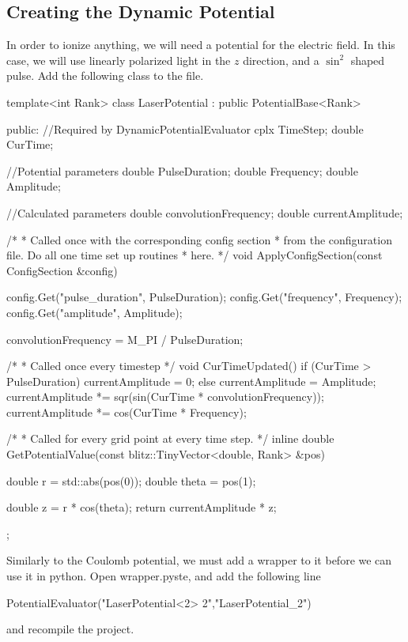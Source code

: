 \subsection{Creating the Dynamic Potential}
In order to ionize anything, we will need a potential for the electric field. In this case, we will use linearly polarized light in the $z$ direction, and a $\sin^2$ shaped pulse. Add the following class to the  file.
\begin{c++}
template<int Rank>
class LaserPotential : public PotentialBase<Rank>
{
public:
	//Required by DynamicPotentialEvaluator
	cplx TimeStep;
	double CurTime;

	//Potential parameters
	double PulseDuration;
	double Frequency;
	double Amplitude;

	//Calculated parameters
	double convolutionFrequency;
	double currentAmplitude;

	/*
	 * Called once with the corresponding config section
	 * from the configuration file. Do all one time set up routines
	 * here.
	 */
	void ApplyConfigSection(const ConfigSection &config)
	{
		config.Get("pulse_duration", PulseDuration);
		config.Get("frequency", Frequency);
		config.Get("amplitude", Amplitude);

		convolutionFrequency = M_PI / PulseDuration;
	}

	/*
	 * Called once every timestep
	 */
	void CurTimeUpdated()
	{
		if (CurTime > PulseDuration)
		{
			currentAmplitude = 0;
		}
		else
		{
			currentAmplitude = Amplitude;
			currentAmplitude *= sqr(sin(CurTime * convolutionFrequency));
			currentAmplitude *= cos(CurTime * Frequency);
		}
	}

	/*
	 * Called for every grid point at every time step. 
	 */
	inline double GetPotentialValue(const blitz::TinyVector<double, Rank> &pos)
	{
		double r = std::abs(pos(0));
		double theta = pos(1);

		double z = r * cos(theta);
		return currentAmplitude * z;
	}
};
\end{c++}
Similarly to the Coulomb potential, we must add a wrapper to it before we can use it in python. Open wrapper.pyste, and add the following line
\begin{python}
PotentialEvaluator("LaserPotential<2> 2","LaserPotential_2")
\end{python}
and recompile the project.

